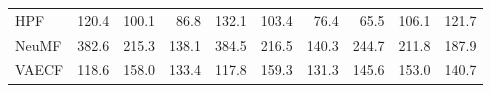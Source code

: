 \begin{tabular}{lrrrrrrrrr}
HPF                &                  120.4 &                  100.1 &                    86.8 &                  132.1 &                  103.4 &                    76.4 &                     65.5 &                    106.1 &                     121.7 \\
NeuMF              &                  382.6 &                  215.3 &                   138.1 &                  384.5 &                  216.5 &                   140.3 &                    244.7 &                    211.8 &                     187.9 \\
VAECF              &                  118.6 &                  158.0 &                   133.4 &                  117.8 &                  159.3 &                   131.3 &                    145.6 &                    153.0 &                     140.7 \\
\bottomrule
\end{tabular}
